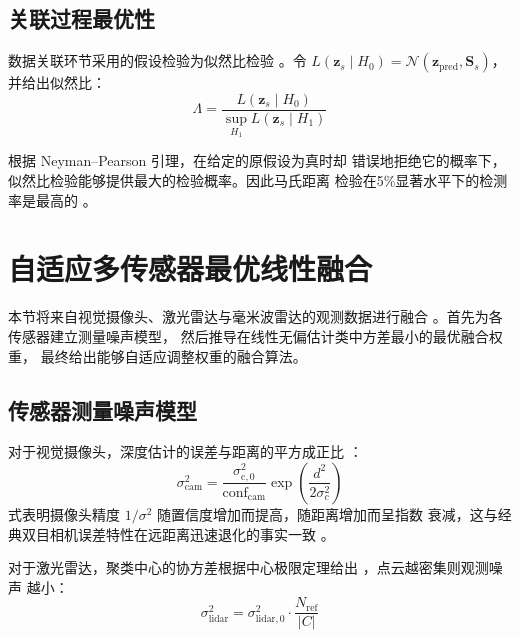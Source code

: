 \documentclass[12pt,a4paper]{ctexart}
\begin{document}
\subsection{关联过程最优性}

数据关联环节采用的假设检验为似然比检验
\cite{neyman1933}。令
$L(\mathbf{z}_s \mid H_0) = \mathcal{N}(\mathbf{z}_{\mathrm{pred}}, \mathbf{S}_s)$，
并给出似然比：
\begin{equation}
\Lambda =
\frac{L(\mathbf{z}_s \mid H_0)}
{\sup_{H_1} L(\mathbf{z}_s \mid H_1)}
\end{equation}

根据 Neyman--Pearson 引理\cite{neyman1933}，在给定的原假设为真时却
错误地拒绝它的概率下，似然比检验能够提供最大的检验概率。因此马氏距离
检验在5\%显著水平下的检测率是最高的
\cite{li1996nn,casella2002statistical}。

\section{自适应多传感器最优线性融合}

本节将来自视觉摄像头、激光雷达与毫米波雷达的观测数据进行融合
\cite{sun2004fusion,li2003fusion}。首先为各传感器建立测量噪声模型，
然后推导在线性无偏估计类中方差最小的最优融合权重\cite{aitken1935}，
最终给出能够自适应调整权重的融合算法。

\subsection{传感器测量噪声模型}

对于视觉摄像头，深度估计的误差与距离的平方成正比
\cite{chatterjee2015stereo}：
\begin{equation}
\sigma_{\mathrm{cam}}^2 =
\frac{\sigma_{\mathrm{c},0}^2}{\mathrm{conf}_{\mathrm{cam}}}
\exp\left( \frac{d^2}{2\sigma_c^2} \right)
\end{equation}
式表明摄像头精度 $1/\sigma^2$ 随置信度增加而提高，随距离增加而呈指数
衰减，这与经典双目相机误差特性在远距离迅速退化的事实一致
\cite{chatterjee2015stereo}。

对于激光雷达，聚类中心的协方差根据中心极限定理给出
\cite{casella2002statistical}，点云越密集则观测噪声
越小：
\begin{equation}
\sigma_{\mathrm{lidar}}^2 =
\sigma_{\mathrm{lidar},0}^2 \cdot \frac{N_{\mathrm{ref}}}{|C|}
\end{equation}
\end{document}

